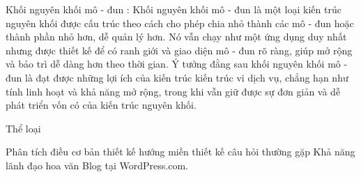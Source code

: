 Khối nguyên khối mô - đun : Khối nguyên khối mô - đun là một loại kiến trúc nguyên khối được cấu trúc theo cách cho phép chia nhỏ thành các mô - đun hoặc thành phần nhỏ hơn, dễ quản lý hơn. Nó vẫn chạy như một ứng dụng duy nhất nhưng được thiết kế để có ranh giới và giao diện mô - đun rõ ràng, giúp mở rộng và bảo trì dễ dàng hơn theo thời gian. Ý tưởng đằng sau khối nguyên khối mô - đun là đạt được những lợi ích của kiến trúc kiến trúc vi dịch vụ, chẳng hạn như tính linh hoạt và khả năng mở rộng, trong khi vẫn giữ được sự đơn giản và dễ phát triển vốn có của kiến trúc nguyên khối.

Thể loại

Phân tích
điều cơ bản
thiết kế hướng miền
thiết kế
câu hỏi thường gặp
Khả năng lãnh đạo
hoa văn
Blog tại WordPress.com.